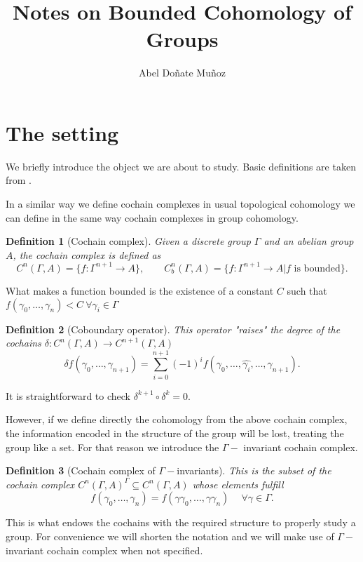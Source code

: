 \documentclass[leqno]{article}
\title{Notes on Bounded Cohomology of Groups}
\author{Abel Doñate Muñoz}
\date{}
\newtheorem*{definition}{Definition}
\begin{document}
\maketitle
\tableofcontents
\newpage

\section{The setting}
We briefly introduce the object we are about to study. Basic definitions are taken from \cite{frigerio}.

In a similar way we define cochain complexes in usual topological cohomology we can define in the same way cochain complexes in group cohomology.

\begin{definition}[Cochain complex] Given a discrete group $\Gamma $ and an abelian group $A$, the cochain complex is defined as
\[
  C^n(\Gamma , A) = \{f: \Gamma ^{n+1}\to A\} , \qquad C^n_{b} (\Gamma , A) = \{f:\Gamma ^{n+1}\to  A | f \text{ is bounded}\}.
\] 
\end{definition}

What makes a function bounded is the existence of a constant $C$ such that  $f(\gamma_0, \ldots, \gamma_n)<C \ \forall \gamma_i\in \Gamma $

\begin{definition}[Coboundary operator] This operator "raises" the degree of the cochains $\delta: C^n(\Gamma , A)\to  C^{n+1}(\Gamma , A)$
\[
  \delta f(\gamma_0,\ldots, \gamma_{n+1}) = \sum_{i=0}^{n+1} (-1)^{i}f(\gamma_0, \ldots, \hat{\gamma_i}, \ldots, \gamma_{n+1}).
\] 
\end{definition}

It is straightforward to check $\delta^{k+1} \circ \delta^k = 0$.

However, if we define directly the cohomology from the above cochain complex, the information encoded in the structure of the group will be lost, treating the group like a set. For that reason we introduce the $\Gamma -$ invariant cochain complex.

\begin{definition}[Cochain complex of $\Gamma -$invariants] This is the subset of the cochain complex $C^n(\Gamma , A)^\Gamma \subseteq C^n(\Gamma , A)$ whose elements fulfill
  \[
  f(\gamma_0,\ldots, \gamma_n) = f(\gamma\gamma_0,\ldots, \gamma\gamma_n) \quad \ \forall \gamma \in \Gamma .
  \] 
\end{definition}
This is what endows the cochains with the required structure to properly study a group. For convenience we will shorten the notation and we will make use of $\Gamma -$invariant cochain complex when not specified.
\end{document}
